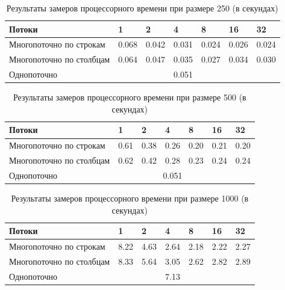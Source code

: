 \documentclass[12pt,a4paper]{report}
\begin{document}
\begin{table}[h!]
	\caption{Результаты замеров процессорного времени при размере 250 (в секундах)}
	\label{tabular:timesandtenses}
	\begin{center}
		\begin{tabular}{ | l | l | l | l | l | l | l | }
			\hline
			Потоки                   & 1     & 2     & 4     & 8     & 16    & 32    \\ \hline
			Многопоточно по строкам  & 0.068 & 0.042 & 0.031 & 0.024 & 0.026 & 0.024 \\ \hline
			Многопоточно по столбцам & 0.064 & 0.047 & 0.035 & 0.027 & 0.034 & 0.030 \\ \hline
			Однопоточно              &       \multicolumn{5}{c}{0.051}       &       \\ \hline
		\end{tabular}
	\end{center}
\end{table}

\begin{table}[h!]
	\caption{Результаты замеров процессорного времени при размере 500 (в секундах)}
	\label{tabular:timesandtenses}

\begin{center}
	\begin{tabular}{ | l | l | l | l | l | l | l | }
		\hline
		Потоки                   & 1    & 2    & 4    & 8    & 16   & 32   \\ \hline
		Многопоточно по строкам  & 0.61 & 0.38 & 0.26 & 0.20 & 0.21 & 0.20 \\ \hline
		Многопоточно по столбцам & 0.62 & 0.42 & 0.28 & 0.23 & 0.24 & 0.24 \\ \hline
		Однопоточно              &     \multicolumn{5}{c}{0.051}    &      \\ \hline
	\end{tabular}
\end{center}
\end{table}

\begin{table}[h!]
\caption{Результаты замеров процессорного времени при размере 1000 (в секундах)}
\label{tabular:timesandtenses}
\begin{center}
	\begin{tabular}{ | l | l | l | l | l | l | l | }
		\hline
		Потоки                   & 1    & 2    & 4    & 8    & 16   & 32   \\ \hline
		Многопоточно по строкам  & 8.22 & 4.63 & 2.64 & 2.18 & 2.22 & 2.27 \\ \hline
		Многопоточно по столбцам & 8.33 & 5.64 & 3.05 & 2.62 & 2.82 & 2.89 \\ \hline
		Однопоточно              &     \multicolumn{5}{c}{7.13}     &      \\ \hline
	\end{tabular}
\end{center}
\end{table}
\end{document}
